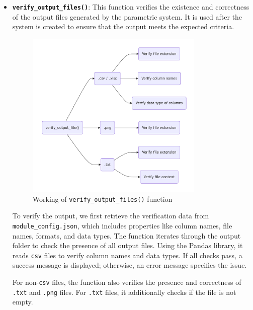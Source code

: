 \begin{itemize}
  \item \textbf{\texttt{verify\_output\_files()}}:
  This function verifies the existence and correctness of the output files generated by the parametric system. It is used after the system is created to ensure 
  that the output meets the expected criteria.
  \begin{figure}[!ht]
    \centering
    \includegraphics[width=0.8\textwidth]{Images/verify_output_file.pdf}
    \caption{Working of \texttt{verify\_output\_files()} function}
    \label{verify_output_files}
  \end{figure}
  
  To verify the output, we first retrieve the verification data from \texttt{module\_config.json}, which includes properties like column names, file names, 
  formats, and data types. The function iterates through the output folder to check the presence of all output files. Using the Pandas library, it reads 
  \texttt{csv} files to verify column names and data types. If all checks pass, a success message is displayed; otherwise, an error message specifies the issue.

  For non-\texttt{csv} files, the function also verifies the presence and correctness of \texttt{.txt} and \texttt{.png} files. For \texttt{.txt} files, it 
  additionally checks if the file is not empty.
\end{itemize}
